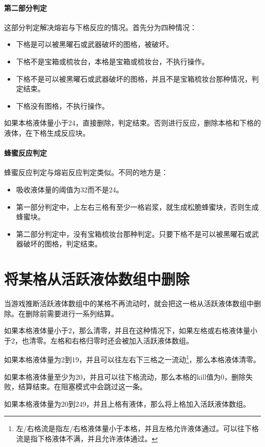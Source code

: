 \paragraph*{第二部分判定}
这部分判定解决熔岩与下格反应的情况。首先分为四种情况：
\begin{itemize}
    \item 下格是可以被黑曜石或武器破坏的图格，被破坏。
    \item 下格不是宝箱或梳妆台，本格是宝箱或梳妆台，不执行操作。
    \item 下格不是可以被黑曜石或武器破坏的图格，并且不是宝箱梳妆台那种情况，判定结束。
    \item 下格没有图格，不执行操作。
\end{itemize}
如果本格液体量小于24，直接删除，判定结束。否则进行反应，删除本格和下格的液体，在下格生成反应块。

\paragraph*{蜂蜜反应判定}
蜂蜜反应判定与熔岩反应判定类似。不同的地方是：
\begin{itemize}
    \item 吸收液体量的阈值为32而不是24。
    \item 第一部分判定中，上左右三格有至少一格岩浆，就生成松脆蜂蜜块，否则生成蜂蜜块。
    \item 第二部分判定中，没有宝箱梳妆台那种判定。只要下格不是可以被黑曜石或武器破坏的图格，判定结束。
\end{itemize}

\section{将某格从活跃液体数组中删除}
当游戏推断活跃液体数组中的某格不再流动时，就会把这一格从活跃液体数组中删除。在删除前需要进行一系列结算。

如果本格液体量小于2，那么清零，并且在这种情况下，如果左格或右格液体量小于2，也清零。左格和右格归零时还会被加入活跃液体数组。

如果本格液体量为2到19，并且可以往左右下三格之一流动\footnote{左/右格流是指左/右格液体量小于本格，并且左格允许液体通过。可以往下格流是指下格液体不满，并且允许液体通过。}，那么本格液体清零。

如果本格液体量至少为20，并且可以往下格流动，那么本格的kill值为0，删除失败，结算结束。在阻塞模式中会跳过这一条。

如果本格液体量为20到249，并且上格有液体，那么将上格加入活跃液体数组。

